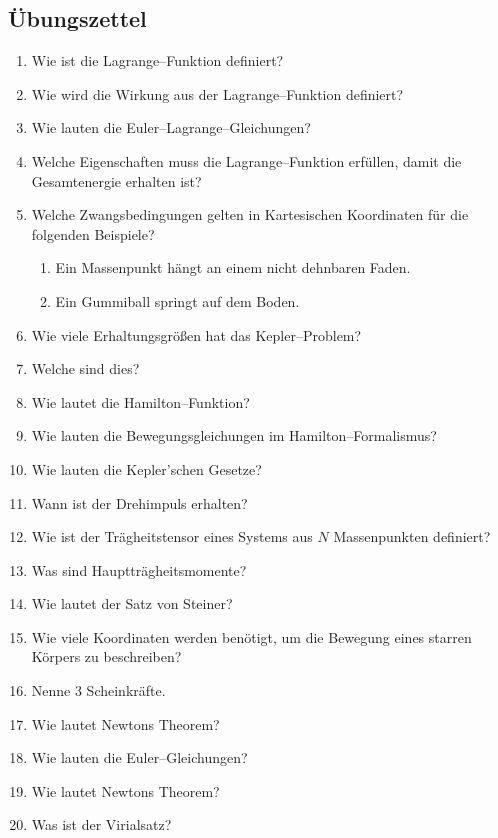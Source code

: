 \documentclass[a4paper,12pt]{article}
\numberwithin{equation}{section}
\begin{document}
\subsection{Übungszettel}
\begin{enumerate}[label=\arabic*.]
        \item Wie ist die Lagrange--Funktion definiert?
        \item Wie wird die Wirkung aus der Lagrange--Funktion definiert?
        \item Wie lauten die Euler--Lagrange--Gleichungen?
        \item Welche Eigenschaften muss die Lagrange--Funktion erfüllen, damit die Gesamtenergie erhalten ist?
        \item Welche Zwangsbedingungen gelten in Kartesischen Koordinaten für die folgenden Beispiele?
                \begin{enumerate}[label=\alph*)]
                        \item Ein Massenpunkt hängt an einem nicht dehnbaren Faden.
                        \item Ein Gummiball springt auf dem Boden.
                \end{enumerate}
        \item Wie viele Erhaltungsgrößen hat das Kepler--Problem?
        \item Welche sind dies?
        \item Wie lautet die Hamilton--Funktion?
        \item Wie lauten die Bewegungsgleichungen im Hamilton--Formalismus?
        \item Wie lauten die Kepler'schen Gesetze?
        \item Wann ist der Drehimpuls erhalten?
        \item Wie ist der Trägheitstensor eines Systems aus $N$ Massenpunkten definiert?
        \item Was sind Hauptträgheitsmomente?
        \item Wie lautet der Satz von Steiner?
        \item Wie viele Koordinaten werden benötigt, um die Bewegung eines starren Körpers zu beschreiben?
        \item Nenne 3 Scheinkräfte.
        \item Wie lautet Newtons Theorem?
        \item Wie lauten die Euler--Gleichungen?
        \item Wie lautet Newtons Theorem?
        \item Was ist der Virialsatz?
\end{enumerate}
\end{document}
